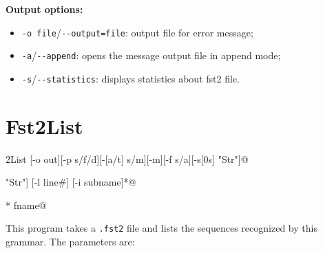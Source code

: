 \bigskip
\noindent \textbf{Output options:}
\begin{itemize}
  \item \verb+-o file+/\verb+--output=file+: output file for error message;
  \item \verb+-a+/\verb+--append+: opens the message output file in append mode;
  \item \verb+-s+/\verb+--statistics+: displays statistics about fst2 file.
\end{itemize}








\section{Fst2List}
\verb@Fst2List [-o out][-p s/f/d][-[a/t] s/m][-m][-f s/a][-s[0s] "Str"]@

\verb@         [-r[s/l] "Str"] [-l line#] [-i subname]*@

\verb@         [-c SS=0xxxx]* fname@

\bigskip
\noindent This program takes a \verb+.fst2+ file and lists the sequences
recognized by this grammar. The parameters are:

